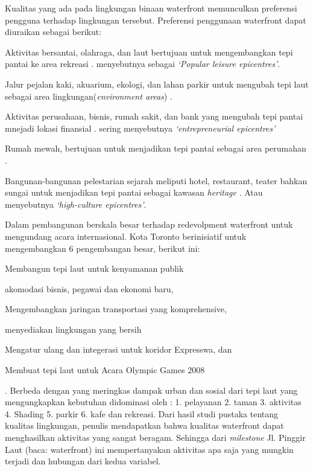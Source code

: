 \documentclass[../projects/thesis.tex]{subfiles}
\begin{document}
Kualitas yang ada pada lingkungan binaan waterfront memunculkan preferensi pengguna terhadap lingkungan tersebut. Preferensi penggunaan waterfront dapat diuraikan sebagai berikut:
\begin{inparaenum}
\item  Aktivitas bersantai, olahraga, dan laut bertujuan untuk mengembangkan tepi pantai ke area rekreasi \citep{breen1994waterfronts}. \cite{gospodini2009} menyebutnya sebagai \textit{`Popular leisure epicentres'}.
\item Jalur pejalan kaki, akuarium, ekologi, dan lahan parkir untuk mengubah tepi laut sebagai area lingkungan(\textit{environment areas}) \citep{costa1990logical}.
\item Aktivitas perusahaan, bisnis, rumah sakit, dan bank yang mengubah tepi pantai mnejadi lokasi finansial \citep{hoyle1999scale} \citep{hoyle2000confrontation}. \cite{gospodini2009} sering menyebutnya \textit{`entrepreneurial epicentres'}
\item Rumah mewah, bertujuan untuk menjadikan tepi pantai sebagai area perumahan \citep{dong2004waterfront}.
\item Bangunan-bangunan pelestarian sejarah meliputi hotel, restaurant, teater bahkan sungai untuk menjadikan tepi pantai sebagai kawasan \textit{heritage} \citep{macleod1999}. Atau \cite{gospodini2009} menyebutnya \textit{`high-culture epicentres'}.
	\end{inparaenum}

	Dalam pembangunan berskala besar terhadap redevolpment waterfront untuk mengundang acara internasional. Kota Toronto berinisiatif untuk mengembangkan 6 pengembangan besar, berikut ini: \begin{inparaenum}\item Membangun tepi laut untuk kenyamanan publik \item akomodasi bisnis, pegawai dan ekonomi baru, \item Mengembangkan jaringan transportasi yang komprehensive, \item menyediakan lingkungan yang bersih \item Mengatur ulang dan integerasi untuk koridor Expresswa, dan \item Membuat tepi laut untuk Acara Olympic Games 2008\end{inparaenum}\citep{white2016}. Berbeda dengan \citep{mostafa2017} yang meringkas dampak urban dan sosial dari tepi laut yang mengungkapkan kebutuhan didominasi oleh : 1. pelayanan 2. taman 3. aktivitas 4. Shading 5. parkir 6. kafe dan rekreasi.
Dari hasil studi pustaka tentang kualitas lingkungan, penulis mendapatkan bahwa kualitas waterfront dapat menghasilkan aktivitas yang sangat beragam. Sehingga dari \textit{milestone} Jl. Pinggir Laut (baca: waterfront) ini mempertanyakan aktivitas apa saja yang mungkin terjadi dan hubungan dari kedua variabel.
\end{document}
